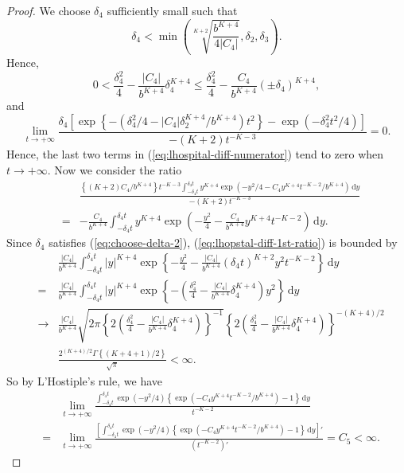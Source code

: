 \documentclass[oneside,english]{amsbook}
\numberwithin{section}{chapter}
\numberwithin{equation}{section}
\numberwithin{figure}{section}
\theoremstyle{plain}
\theoremstyle{plain}
\theoremstyle{definition}
\theoremstyle{plain}
\theoremstyle{plain}
\theoremstyle{remark}
\theoremstyle{definition}
\theoremstyle{definition}
\newcommand{\diff}{\,\mathrm{d}}
\begin{document}
\begin{proof}
We choose $\delta_{4}$ sufficiently small such that 
\begin{equation}
\delta_{4}<\min\left(\sqrt[K+2]{\frac{b^{K+4}}{4\left|C_{4}\right|}},\delta_{2},\delta_{3}\right).\label{eq:choose-delta-2}
\end{equation}
Hence, 
\[
0<\frac{\delta_{4}^{2}}{4}-\frac{\left|C_{4}\right|}{b^{K+4}}\delta_{4}^{K+4}\le\frac{\delta_{4}^{2}}{4}-\frac{C_{4}}{b^{K+4}}\left(\pm\delta_{4}\right)^{K+4},
\]
and 
\[
\lim_{t\rightarrow+\infty}\frac{\delta_{4}\left[\exp\left\{ -\left(\delta_{4}^{2}/4-\left|C_{4}\right|\delta_{2}^{K+4}/b^{K+4}\right)t^{2}\right\} -\exp\left(-\delta_{4}^{2}t^{2}/4\right)\right]}{-\left(K+2\right)t^{-K-3}}=0.
\]
Hence, the last two terms in (\ref{eq:lhospital-diff-numerator})
tend to zero when $t\rightarrow+\infty$. Now we consider the ratio
\begin{eqnarray}
 &  & \frac{\left\{ \left(K+2\right)C_{4}/b^{K+4}\right\} t^{-K-3}\int_{-\delta_{4}t}^{\delta_{4}t}y^{K+4}\exp\left(-y^{2}/4-C_{4}y^{K+4}t^{-K-2}/b^{K+4}\right)\diff y}{-\left(K+2\right)t^{-K-3}}\nonumber \\
 & = & -\frac{C_{4}}{b^{K+4}}\int_{-\delta_{4}t}^{\delta_{4}t}y^{K+4}\exp\left(-\frac{y^{2}}{4}-\frac{C_{4}}{b^{K+4}}y^{K+4}t^{-K-2}\right)\diff y.\label{eq:lhopstal-diff-1st-ratio}
\end{eqnarray}
Since $\delta_{4}$ satisfies (\ref{eq:choose-delta-2}), (\ref{eq:lhopstal-diff-1st-ratio})
is bounded by 
\begin{eqnarray*}
 &  & \frac{\left|C_{4}\right|}{b^{K+4}}\int_{-\delta_{4}t}^{\delta_{4}t}\left|y\right|^{K+4}\exp\left\{ -\frac{y^{2}}{4}-\frac{\left|C_{4}\right|}{b^{K+4}}\left(\delta_{4}t\right)^{K+2}y^{2}t^{-K-2}\right\} \diff y\\
 & = & \frac{\left|C_{4}\right|}{b^{K+4}}\int_{-\delta_{4}t}^{\delta_{4}t}\left|y\right|^{K+4}\exp\left\{ -\left(\frac{\delta_{4}^{2}}{4}-\frac{\left|C_{4}\right|}{b^{K+4}}\delta_{4}^{K+4}\right)y^{2}\right\} \diff y\\
 & \rightarrow & \frac{\left|C_{4}\right|}{b^{K+4}}\sqrt{2\pi\left\{ 2\left(\frac{\delta_{4}^{2}}{4}-\frac{\left|C_{4}\right|}{b^{K+4}}\delta_{4}^{K+4}\right)\right\} ^{-1}}\left\{ 2\left(\frac{\delta_{4}^{2}}{4}-\frac{\left|C_{4}\right|}{b^{K+4}}\delta_{4}^{K+4}\right)\right\} ^{-\left(K+4\right)/2}\\ & &\frac{2^{\left(K+4\right)/2}\Gamma\left\{ \left(K+4+1\right)/2\right\} }{\sqrt{\pi}}<\infty.
\end{eqnarray*}
So by L'Hostiple's rule, we have 
\begin{eqnarray*}
 &  & \lim_{t\rightarrow+\infty}\frac{\int_{-\delta_{4}t}^{\delta_{4}t}\exp\left(-y^{2}/4\right)\left\{ \exp\left(-C_{4}y^{K+4}t^{-K-2}/b^{K+4}\right)-1\right\} \diff y}{t^{-K-2}}\\
 & = & \lim_{t\rightarrow+\infty}\frac{\left[\int_{-\delta_{4}t}^{\delta_{4}t}\exp\left(-y^{2}/4\right)\left\{ \exp\left(-C_{4}y^{K+4}t^{-K-2}/b^{K+4}\right)-1\right\} \diff y\right]'}{\left(t^{-K-2}\right)'}=C_{5}<\infty.
\end{eqnarray*}
\end{proof}
\end{document}
